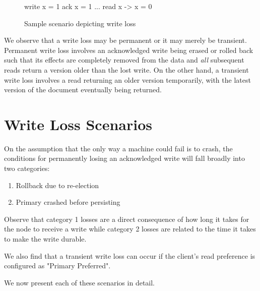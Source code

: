 \begin{figure}
    \begin{CVerbatim}
write x = 1
ack   x = 1
...
read  x -> x = 0
    \end{CVerbatim}
    \caption{Sample scenario depicting write loss}
    \label{fig:wl}
\end{figure}

We observe that a write loss may be permanent or it may merely be transient. Permanent write loss involves an acknowledged write being erased or rolled back such that its effects are completely removed from the data and \textit{all} subsequent reads return a version older than the lost write. On the other hand, a transient write loss involves a read returning an older version temporarily, with the latest version of the document eventually being returned.

\section{Write Loss Scenarios}
On the assumption that the only way a machine could fail is to crash, the conditions for permanently losing an acknowledged write will fall broadly into two categories:
\begin{enumerate}
    \item Rollback due to re-election
    \item Primary crashed before persisting
\end{enumerate}

Observe that category 1 losses are a direct consequence of how long it takes for the node to receive a write while  category 2 losses are related to the time it takes to make the write durable. 

We also find that a transient write loss can occur if the client's read preference is configured as "Primary Preferred".

We now present each of these scenarios in detail.

\pagebreak
